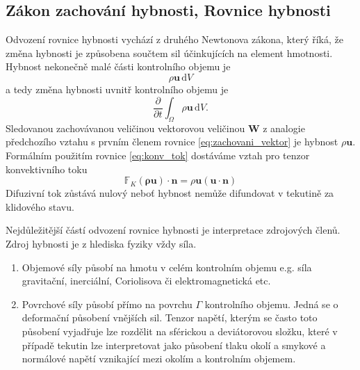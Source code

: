 \subsection{Zákon zachování hybnosti, Rovnice hybnosti}
Odvození rovnice hybnosti vychází z druhého Newtonova zákona, který říká, že změna hybnosti je způsobena součtem sil účinkujících na element hmotnosti.
Hybnost nekonečně malé části kontrolního objemu je\begin{equation}
\rho \mathbf{u}\,\mathrm{d}V
\end{equation}
a tedy změna hybnosti uvnitř kontrolního objemu je
\begin{equation}
\dfrac{\partial}{\partial t}\int_\Omega\rho\mathbf{u}\,\mathrm{d}V.
\end{equation}
Sledovanou zachovávanou veličinou vektorovou veličinou $\mathbf{W}$ z analogie předchozího vztahu s prvním členem rovnice \ref{eq:zachovani_vektor} je hybnost $\rho \mathbf{u}$. Formálním použitím rovnice \ref{eq:konv_tok} dostáváme vztah pro tenzor konvektivního toku
\begin{equation}
\mathbb{F}_K(\mathbf{\rho\mathbf{u}})\cdot \mathbf{n}=\rho\mathbf{u} (\mathbf{u}\cdot\mathbf{n})
\end{equation}
Difuzivní tok zůstává nulový neboť hybnost nemůže difundovat v tekutině za klidového stavu.

Nejdůležitější částí odvození rovnice hybnosti je interpretace zdrojových členů. Zdroj hybnosti je z hlediska fyziky vždy síla.
\begin{enumerate}
	\item Objemové síly působí na hmotu v celém kontrolním objemu e.g. síla gravitační, inerciální, Coriolisova či elektromagnetická etc. 
	\item Povrchové síly působí přímo na povrchu $\Gamma$ kontrolního objemu. Jedná se o deformační působení vnějších sil. Tenzor napětí, kterým se často toto působení vyjadřuje lze rozdělit na sférickou a deviátorovou složku, které v případě tekutin lze interpretovat jako působení tlaku okolí a smykové a normálové napětí vznikající mezi okolím a kontrolním objemem.
\end{enumerate}


